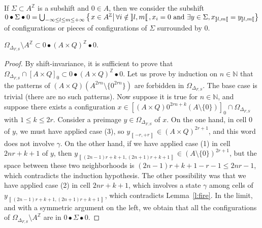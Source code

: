 \documentclass{jac}
\newcommand{\Z}{\mathbb Z}
\newcommand{\N}{\mathbb N}
\newcommand{\az}{{A^\Z}}
\newcommand{\sett}[2]{\left\{\left.#1\vphantom{#2}\right|#2\right\}}
\newcommand{\set}[3]{\sett{#1\in#2}{#3}}
\newcommand{\oo}[2]{\left\rrbracket #1,#2\right\llbracket}
\newcommand{\cc}[2]{\left\llbracket #1,#2\right\rrbracket}
\newcommand{\scc}[2]{_{\cc{#1}{#2}}}\newcommand{\soo}[2]{_{\oo{#1}{#2}}}\newcommand{\co}[2]{\left\llbracket #1,#2\right\llbracket}\newcommand{\sco}[2]{_{\co{#1}{#2}}}\newcommand{\kaprx}[1]{\mathcal A_{#1}}
\theoremstyle{definition}
\begin{document}
If $\Sigma\subset\az$ is a subshift and $0\in A$, then we consider the subshift $0\bullet\Sigma\bullet 0=\bigcup_{-\infty\le l\le m\le+\infty}\set x\az{\forall i\notin\oo lm,x_i=0\text{ and }\exists y\in\Sigma,x\soo lm=y\soo lm}$ of configurations or pieces of configurations of $\Sigma$ surrounded by $0$.
\begin{lem}\label{l:ssgamma}
$\Omega_{\Delta_{F,S}}\setminus\az\subset0\bullet(A\times Q)^\Z\bullet0$.
\end{lem}
\begin{proof}
By shift-invariance, it is sufficient to prove that $\Omega_{\Delta_{F,S}}\cap[A\times Q]_0\subset0\bullet(A\times Q)^\Z\bullet0$.  
Let us prove by induction on $n\in\N$ that the patterns of $(A\times Q)(A^{2rn}\setminus\{0^{2rn}\})$ are forbidden in $\Omega_{\Delta_{F,S}}$. The base case is trivial (there are no such patterns). Now suppose it is true for $n\in\N$, and suppose there exists a configuration $x\in[(A\times Q)0^{2rn+k}(A\setminus\{0\})]_0\cap\Omega_{\Delta_{F,S}}$ with $1\le k\le2r$. Consider a preimage $y\in\Omega_{\Delta_{F,S}}$ of $x$. On the one hand, in cell $0$ of $y$, we must have applied case (3), so $y\scc{-r}{+r}\in(A\times Q)^{2r+1}$, and this word does not involve $\gamma$.
On the other hand, if we have applied case (1) in cell $2nr+k+1$ of $y$, then $y\scc{(2n-1)r+k+1}{(2n+1)r+k+1}\in(A\setminus\{0\})^{2r+1}$, but the space between these two neighborhoods is $(2n-1)r+k+1-r-1\le2nr-1$, which contradicts the induction hypothesis.
The other possibility was that we have applied case (2) in cell $2nr+k+1$, which involves a state $\gamma$ among cells of $y\scc{(2n-1)r+k+1}{(2n+1)r+k+1}$, which contradicts Lemma~\ref{l:fire}.
In the limit, and with a symmetric argument on the left, we obtain that all the configurations of $\Omega_{\Delta_{F,S}}\setminus\az$ are in $0\bullet\Sigma\bullet 0$.
\end{proof}
\end{document}
